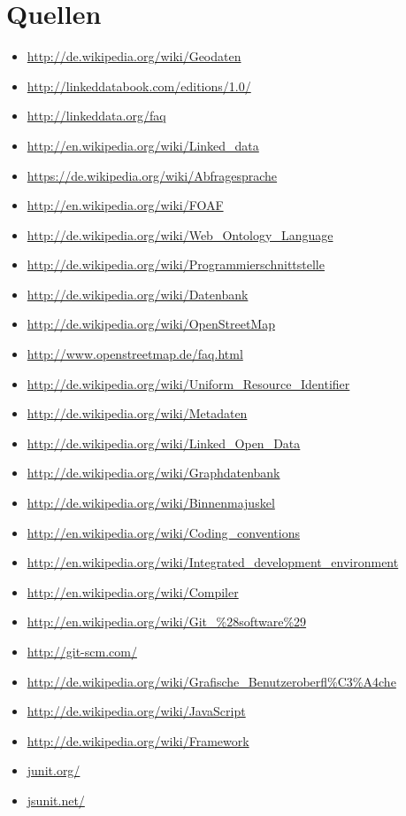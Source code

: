 \documentclass[11pt,a4paper]{article}
\begin{document}
\section{Quellen}
\begin{itemize}
\item \url{http://de.wikipedia.org/wiki/Geodaten}
\item \url{http://linkeddatabook.com/editions/1.0/}
\item \url{http://linkeddata.org/faq}
\item \url{http://en.wikipedia.org/wiki/Linked_data}
\item \url{https://de.wikipedia.org/wiki/Abfragesprache}
\item \url{http://en.wikipedia.org/wiki/FOAF}
\item \url{http://de.wikipedia.org/wiki/Web_Ontology_Language}
\item \url{http://de.wikipedia.org/wiki/Programmierschnittstelle}
\item \url{http://de.wikipedia.org/wiki/Datenbank}
\item \url{http://de.wikipedia.org/wiki/OpenStreetMap}
\item \url{http://www.openstreetmap.de/faq.html}
\item \url{http://de.wikipedia.org/wiki/Uniform_Resource_Identifier}
\item \url{http://de.wikipedia.org/wiki/Metadaten}
\item \url{http://de.wikipedia.org/wiki/Linked_Open_Data}
\item \url{http://de.wikipedia.org/wiki/Graphdatenbank}
\item \url{http://de.wikipedia.org/wiki/Binnenmajuskel}
\item \url{http://en.wikipedia.org/wiki/Coding_conventions}
\item \url{http://en.wikipedia.org/wiki/Integrated_development_environment}
\item \url{http://en.wikipedia.org/wiki/Compiler}
\item \url{http://en.wikipedia.org/wiki/Git_%28software%29}
\item \url{http://git-scm.com/}
\item \url{http://de.wikipedia.org/wiki/Grafische_Benutzeroberfl%C3%A4che}
\item \url{http://de.wikipedia.org/wiki/JavaScript}
\item \url{http://de.wikipedia.org/wiki/Framework}
\item \url{junit.org/}
\item \url{jsunit.net/}
\end{itemize}
\end{document}
